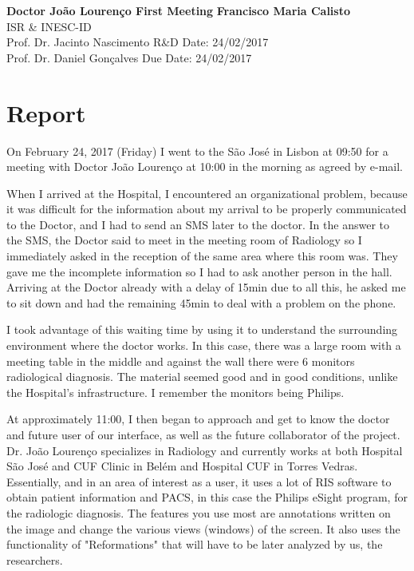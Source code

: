\documentclass[a4paper, 11pt]{article}
\begin{document}
\noindent
\large\textbf{Doctor Jo\~{a}o Louren\c{c}o First Meeting} \hfill \textbf{Francisco Maria Calisto} \\
\normalsize ISR \& INESC-ID \\
Prof. Dr. Jacinto Nascimento \hfill R\&D Date: 24/02/2017 \\
Prof. Dr. Daniel Gon\c{c}alves \hfill Due Date: 24/02/2017

\section*{Report}

On February 24, 2017 (Friday) I went to the S\~{a}o Jos\'{e} in Lisbon at 09:50 for a meeting with Doctor Jo\~{a}o Louren\c{c}o at 10:00 in the morning as agreed by e-mail.

When I arrived at the Hospital, I encountered an organizational problem, because it was difficult for the information about my arrival to be properly communicated to the Doctor, and I had to send an SMS later to the doctor. In the answer to the SMS, the Doctor said to meet in the meeting room of Radiology so I immediately asked in the reception of the same area where this room was. They gave me the incomplete information so I had to ask another person in the hall. Arriving at the Doctor already with a delay of 15min due to all this, he asked me to sit down and had the remaining 45min to deal with a problem on the phone.

I took advantage of this waiting time by using it to understand the surrounding environment where the doctor works. In this case, there was a large room with a meeting table in the middle and against the wall there were 6 monitors radiological diagnosis. The material seemed good and in good conditions, unlike the Hospital's infrastructure. I remember the monitors being Philips.

At approximately 11:00, I then began to approach and get to know the doctor and future user of our interface, as well as the future collaborator of the project. Dr. Jo\~{a}o Louren\c{c}o \cite{joaoLourenco} specializes in Radiology and currently works at both Hospital São José and CUF Clinic in Belém and Hospital CUF in Torres Vedras. Essentially, and in an area of ​​interest as a user, it uses a lot of RIS software to obtain patient information and PACS, in this case the Philips eSight program, for the radiologic diagnosis. The features you use most are annotations written on the image and change the various views (windows) of the screen. It also uses the functionality of "Reformations" that will have to be later analyzed by us, the researchers.
\end{document}
